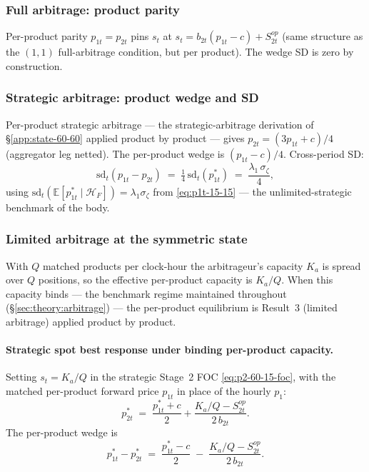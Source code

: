 \documentclass[11pt,a4paper]{article}
\theoremstyle{definition}
\theoremstyle{remark}
\theoremstyle{plain}
\begin{document}
\subsubsection{Full arbitrage: product parity}\label{app:15-15:full}
Per-product parity $p_{1t} = p_{2t}$ pins $s_t$ at $s_t = b_{2t}(p_{1t} - c) + S^{op}_{2t}$ (same structure as the $(1,1)$ full-arbitrage condition, but per product). The wedge SD is zero by construction.

\subsubsection{Strategic arbitrage: product wedge and SD}\label{app:15-15:strategic}
Per-product strategic arbitrage --- the strategic-arbitrage derivation of \S\ref{app:state-60-60} applied product by product --- gives $p_{2t} = (3 p_{1t} + c)/4$ (aggregator leg netted). The per-product wedge is $(p_{1t} - c)/4$. Cross-period SD:
\[
\mathrm{sd}_t(p_{1t} - p_{2t}) \;=\; \tfrac{1}{4}\,\mathrm{sd}_t(p_{1t}^*) \;=\; \frac{\lambda_1\,\sigma_\zeta}{4},
\]
using $\mathrm{sd}_t(\mathbb{E}[p_{1t}^* \mid \mathcal{H}_F]) = \lambda_1\sigma_\zeta$ from \eqref{eq:p1t-15-15} --- the unlimited-strategic benchmark of the body.

\subsubsection{Limited arbitrage at the symmetric state}\label{app:15-15:limited}

With $Q$ matched products per clock-hour the arbitrageur's capacity $K_a$ is spread over $Q$ positions, so the effective per-product capacity is $K_a/Q$. When this capacity binds --- the benchmark regime maintained throughout (\S\ref{sec:theory:arbitrage}) --- the per-product equilibrium is \citeauthor{ito_reguant_2016} Result~3 (limited arbitrage) applied product by product.

\paragraph{Strategic spot best response under binding per-product capacity.} Setting $s_t = K_a/Q$ in the strategic Stage~2 FOC \eqref{eq:p2-60-15-foc}, with the matched per-product forward price $p_{1t}$ in place of the hourly $p_1$:
\[
p_{2t}^* \;=\; \frac{p_{1t}^* + c}{2} + \frac{K_a/Q - S^{op}_{2t}}{2\, b_{2t}}.
\]
The per-product wedge is
\[
p_{1t}^* - p_{2t}^* \;=\; \frac{p_{1t}^* - c}{2} \;-\; \frac{K_a/Q - S^{op}_{2t}}{2\, b_{2t}}.
\]
\end{document}
